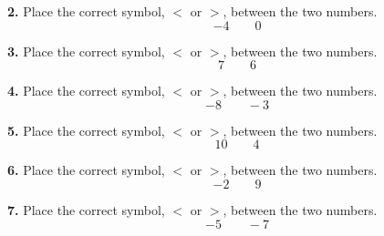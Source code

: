 \documentclass{ximera}
\begin{document}
\begin{problem}
\textbf{2.} Place the correct symbol, $<$ or $>$, between the two numbers.
\[
-4 \qquad 0
\]

\begin{multipleChoice}
\end{multipleChoice}
\end{problem}

\begin{problem}
\textbf{3.} Place the correct symbol, $<$ or $>$, between the two numbers.
\[
7 \qquad 6
\]

\begin{multipleChoice}
\end{multipleChoice}
\end{problem}

\begin{problem}
\textbf{4.} Place the correct symbol, $<$ or $>$, between the two numbers.
\[
-8 \qquad -3
\]

\begin{multipleChoice}
\end{multipleChoice}
\end{problem}

\begin{problem}
\textbf{5.} Place the correct symbol, $<$ or $>$, between the two numbers.
\[
10 \qquad 4
\]

\begin{multipleChoice}
\end{multipleChoice}
\end{problem}

\begin{problem}
\textbf{6.} Place the correct symbol, $<$ or $>$, between the two numbers.
\[
-2 \qquad 9
\]

\begin{multipleChoice}
\end{multipleChoice}
\end{problem}

\begin{problem}
\textbf{7.} Place the correct symbol, $<$ or $>$, between the two numbers.
\[
-5 \qquad -7
\]

\begin{multipleChoice}
\end{multipleChoice}
\end{problem}
\end{document}
